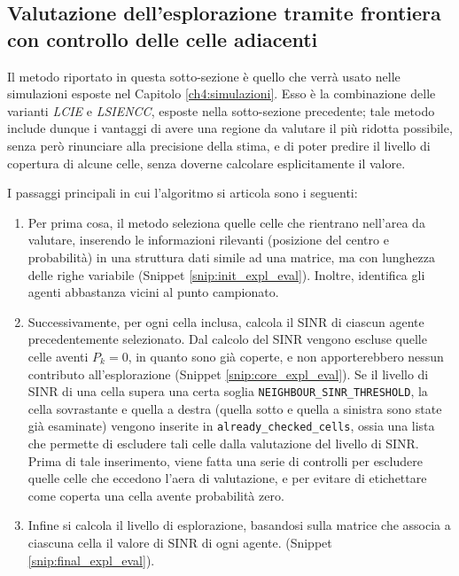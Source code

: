 \subsection{Valutazione dell'esplorazione tramite frontiera con controllo delle celle adiacenti} \label{subsec:expl_eval_frontier_NCC}
Il metodo riportato in questa sotto-sezione è quello che verrà usato nelle simulazioni esposte nel Capitolo \ref{ch4:simulazioni}.
Esso è la combinazione delle varianti \textit{LCIE} e \textit{LSIENCC}, esposte nella sotto-sezione precedente; tale metodo include dunque i vantaggi di avere una regione da valutare il più ridotta possibile, senza però rinunciare alla precisione della stima, e di poter predire il livello di copertura di alcune celle, senza doverne calcolare esplicitamente il valore.

I passaggi principali in cui l'algoritmo si articola sono i seguenti:
\begin{enumerate}[wide]


\item
Per prima cosa, il metodo seleziona quelle celle che rientrano nell'area da valutare, inserendo le informazioni rilevanti (posizione del centro e probabilità) in una struttura dati simile ad una matrice, ma con lunghezza delle righe variabile (Snippet \ref{snip:init_expl_eval}).
Inoltre, identifica gli agenti abbastanza vicini al punto campionato.



\item
Successivamente, per ogni cella inclusa, calcola il SINR di ciascun agente precedentemente selezionato.
Dal calcolo del SINR vengono escluse quelle celle aventi $P_k=0$,  in quanto sono già coperte, e non apporterebbero nessun contributo all'esplorazione (Snippet \ref{snip:core_expl_eval}).
Se il livello di SINR di una cella supera una certa soglia \texttt{NEIGHBOUR\_SINR\_THRESHOLD}, la cella sovrastante e quella a destra (quella sotto e quella a sinistra sono state già esaminate) vengono inserite in \texttt{already\_checked\_cells}, ossia una lista che permette di escludere tali celle dalla valutazione del livello di SINR.
Prima di tale inserimento, viene fatta una serie di controlli per escludere quelle celle che eccedono l'aera di valutazione, e per evitare di etichettare come coperta una cella avente probabilità zero. 



\item
Infine si calcola il livello di esplorazione, basandosi sulla matrice che associa a ciascuna cella il valore di SINR di ogni agente. (Snippet \ref{snip:final_expl_eval}).



\end{enumerate}